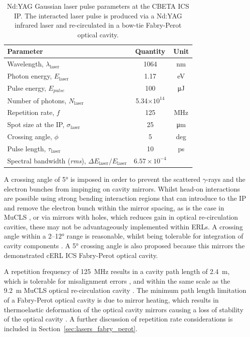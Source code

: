 \documentclass[../main.tex]{subfiles}
\begin{document}
\begin{table}[!h]
\centering
\caption{Nd:YAG Gaussian laser pulse parameters at the CBETA ICS IP. The interacted laser pulse is produced via a Nd:YAG infrared laser and re-circulated in a bow-tie Fabry-Perot optical cavity.}
\begin{tabular}{lcc}
\hline\hline
Parameter & Quantity & Unit \\
\hline
Wavelength, $\lambda_\textrm{laser}$ & 1064 & \si{\nano\meter}\\
Photon energy, $E_\textrm{laser}$ & 1.17 & \si{\electronvolt}\\
Pulse energy, $E_{pulse}$  & 100 & \si{\micro\joule}\\
Number of photons, $N_{\textrm{laser}}$ & 5.34$\times 10^{14}$ & \\ 
Repetition rate, $f$ & 125 & \si{\mega\hertz}\\
Spot size at the IP, $\sigma_\textrm{laser}$ & 25 & \si{\micro\meter}\\
Crossing angle, $\phi$ & 5 & deg \\
Pulse length, $\tau_{\mathrm{laser}}$  & 10 & \si{\pico\second}\\
Spectral bandwidth (\textit{rms}), $\Delta E_\textrm{laser}/E_\textrm{laser}$ & $6.57\times 10^{-4}$ &   \\
\hline\hline
\end{tabular}
\label{tab:DIANA_laser_pulse_design_parameters}
\end{table}

A crossing angle of 5\si{\degree} is imposed in order to prevent the scattered $\gamma$-rays and the electron bunches from impinging on cavity mirrors. Whilst head-on interactions are possible using strong bending interaction regions that can introduce to the IP and remove the electron bunch within the mirror spacing, as is the case in MuCLS \cite{eggl2016munich}, or via mirrors with holes, which reduces gain in optical re-circulation cavities, these may not be advantageously implemented within ERLs. A crossing angle within a 2--12\si{\degree} range is reasonable, whilst being tolerable for integration of cavity components \cite{variola2011luminosity}. A 5\si{\degree} crossing angle is also proposed because this mirrors the demonstrated cERL ICS \cite{akagi2016narrow} Fabry-Perot optical cavity. 

A repetition frequency of 125~\si{\mega\hertz} results in a cavity path length of 2.4~\si{\meter}, which is tolerable for misalignment errors \cite{zomer2009polarization}, and within the same scale as the 9.2~\si{\meter} MuCLS optical re-circulation cavity \cite{eggl2016munich}. The minimum path length limitation of a Fabry-Perot optical cavity is due to mirror heating, which results in thermoelastic deformation of the optical cavity mirrors causing a loss of stability of the optical cavity \cite{chaikovska2016high}. A further discussion of repetition rate considerations is included in Section~\ref{sec:lasers_fabry_perot}.   
\end{document}
